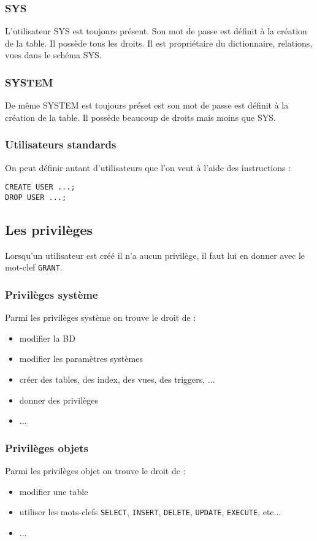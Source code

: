 \documentclass[10pt,a4paper,twoside]{article}
\begin{document}
\subsubsection{SYS}
L'utilisateur SYS est toujours présent. Son mot de passe est définit à la création de la table. Il possède tous les droits. Il est propriétaire du dictionnaire, relations, vues dans le schéma SYS.

\subsubsection{SYSTEM}
De même SYSTEM est toujours préset est son mot de passe est définit à la création de la table. Il possède beaucoup de droits mais moins que SYS.

\subsubsection{Utilisateurs standards}
On peut définir autant d'utilisateurs que l'on veut à l'aide des instructions :
\begin{verbatim}
CREATE USER ...;
DROP USER ...;
\end{verbatim}

\subsection{Les privilèges}
Lorsqu'un utilisateur est créé il n'a aucun privilège, il faut lui en donner avec le mot-clef \verb=GRANT=.

\subsubsection{Privilèges système}
Parmi les privilèges système on trouve le droit de :
\begin{itemize}
\item modifier la BD
\item modifier les paramètres systèmes
\item créer des tables, des index, des vues, des triggers, ...
\item donner des privilèges
\item ...
\end{itemize}

\subsubsection{Privilèges objets}
Parmi les privilèges objet on trouve le droit de :
\begin{itemize}
\item modifier une table
\item utiliser les mots-clefs \verb=SELECT=, \verb=INSERT=, \verb=DELETE=, \verb=UPDATE=, \verb=EXECUTE=, etc...
\item ...
\end{itemize}
\end{document}
